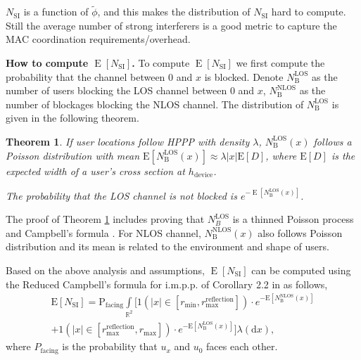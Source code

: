 \documentclass[10pt, conference, letterpaper]{IEEEtran}
\newtheorem{theorem}{Theorem}
\DeclareMathOperator*{\E}{\mathrm{E}}
\DeclareMathOperator*{\LOS}{\mathrm{LOS}}
\DeclareMathOperator*{\NLOS}{\mathrm{NLOS}}
\begin{document}
$N_{\mathrm{SI}}$ is a function of $\tilde{\phi}$, and this makes the distribution of $N_{\mathrm{SI}}$ hard to compute. 
Still the average number of strong interferers is a good metric to capture the MAC coordination requirements/overhead.


\textbf{How to compute \boldmath$\E[N_{\mathrm{SI}}]$.}
To compute $\E[N_{\mathrm{SI}}]$ we first compute the probability that the channel between $0$ and $x$ is blocked. 
Denote $N_{\mathrm{B}}^{\LOS}$ as the number of users blocking the LOS channel between $0$ and $x$, $N_{\mathrm{B}}^{\NLOS}$ as the number of blockages blocking the NLOS channel. 
The distribution of $N_\mathrm{B}^{\LOS}$ is given in the following theorem. 
\begin{theorem}\label{theorem:E_N_B_LOS}
	If user locations follow HPPP with density $\lambda$, $N_\mathrm{B}^\mathrm{LOS}(x)$ follows a Poisson distribution with mean $\mathrm{E}[N_{\mathrm{B}}^\mathrm{LOS}(x)] \approx \lambda |x| \mathrm{E}[D]$, where $\mathrm{E}[D]$ is the expected width of a user's cross section at $h_{\mathrm{device}}$.
	
	The probability that the LOS channel is not blocked is $e^{-\E[N_\mathrm{B}^\mathrm{LOS}(x)]}$.
\end{theorem}

The proof of Theorem \ref{theorem:E_N_B_LOS} includes proving that $N_B^{\LOS}$ is a thinned Poisson process \cite{poisson} and Campbell's formula \cite{stochasticgeometry}.
For NLOS channel, $N_{\mathrm{B}}^\mathrm{NLOS}(x)$ also follows Poisson distribution and its mean is related to the environment and shape of users. 




Based on the above analysis and assumptions, $\E[N_{\mathrm{SI}}]$ can be computed using the Reduced Campbell's formula for i.m.p.p. of Corollary 2.2 in \cite{stochasticgeometry} as follows,
\begin{multline}\label{eq:E_N_SI}
\mathrm{E}[N_{\mathrm{SI}}] =  \mathrm{P}_{\text{facing}} \int\limits_{\mathbb{R}^2} 
 \big[\text{1}(|x|\in[r_{\min},r_{\text{max}}^{\mathrm{reflection}}])
\cdot e^{-\mathrm{E}[N_{\mathrm{B}}^\mathrm{NLOS}(x)]} \\
+ \text{1}(|x|\in[r_{\text{max}}^{\mathrm{reflection}},r_{\text{max}}])
\cdot e^{-\mathrm{E}[N_{\mathrm{B}}^\mathrm{LOS}(x)]} \big]\lambda(\mathrm{d}x),
\end{multline}
where $P_{\text{facing}}$ is the probability that $u_x$ and $u_0$ faces each other.
\end{document}

